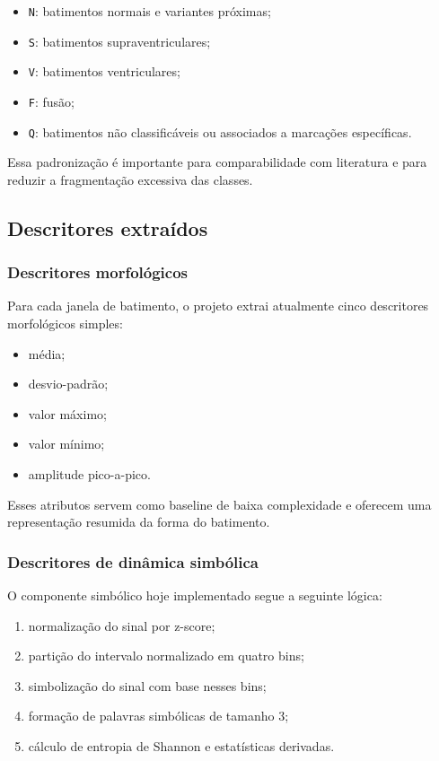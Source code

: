 \documentclass[12pt,a4paper]{article}
\begin{document}
\begin{itemize}
    \item \texttt{N}: batimentos normais e variantes pr\'oximas;
    \item \texttt{S}: batimentos supraventriculares;
    \item \texttt{V}: batimentos ventriculares;
    \item \texttt{F}: fus\~ao;
    \item \texttt{Q}: batimentos n\~ao classific\'aveis ou associados a marca\c{c}\~oes espec\'ificas.
\end{itemize}

Essa padroniza\c{c}\~ao \'e importante para comparabilidade com literatura e para reduzir a fragmenta\c{c}\~ao excessiva das classes.

\subsection{Descritores extra\'idos}
\subsubsection{Descritores morfol\'ogicos}
Para cada janela de batimento, o projeto extrai atualmente cinco descritores morfol\'ogicos simples:

\begin{itemize}
    \item m\'edia;
    \item desvio-padr\~ao;
    \item valor m\'aximo;
    \item valor m\'inimo;
    \item amplitude pico-a-pico.
\end{itemize}

Esses atributos servem como baseline de baixa complexidade e oferecem uma representa\c{c}\~ao resumida da forma do batimento.

\subsubsection{Descritores de din\^amica simb\'olica}
O componente simb\'olico hoje implementado segue a seguinte l\'ogica:

\begin{enumerate}[label=\arabic*.]
    \item normaliza\c{c}\~ao do sinal por z-score;
    \item parti\c{c}\~ao do intervalo normalizado em quatro bins;
    \item simboliza\c{c}\~ao do sinal com base nesses bins;
    \item forma\c{c}\~ao de palavras simb\'olicas de tamanho 3;
    \item c\'alculo de entropia de Shannon e estat\'isticas derivadas.
\end{enumerate}
\end{document}
